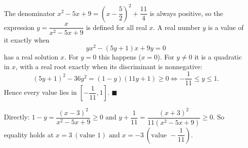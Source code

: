 The denominator $x^2-5x+9=\left(x-\dfrac52\right)^2+\dfrac{11}{4}$ is always positive, so the expression $y=\dfrac{x}{x^2-5x+9}$ is defined for all real $x$. A real number $y$ is a value of it exactly when
\[yx^2-(5y+1)x+9y=0\]
has a real solution $x$. For $y=0$ this happens ($x=0$). For $y\ne0$ it is a quadratic in $x$, with a real root exactly when its discriminant is nonnegative:
\[(5y+1)^2-36y^2=(1-y)(11y+1)\ge0\iff-\dfrac1{11}\le y\le1.\]
Hence every value lies in $\left[-\dfrac1{11},1\right]$. $\blacksquare$

Directly: $1-y=\dfrac{(x-3)^2}{x^2-5x+9}\ge0$ and $y+\dfrac1{11}=\dfrac{(x+3)^2}{11\left(x^2-5x+9\right)}\ge0$. So equality holds at $\boxed{x=3\ (\text{value }1)\text{ and }x=-3\ \left(\text{value }-\dfrac1{11}\right)}$.
